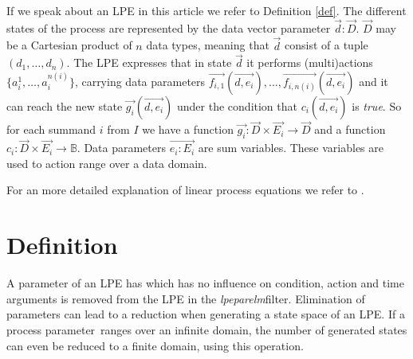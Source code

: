 \documentclass[a4paper,10pt]{article}
\theoremstyle{plain}
\theoremstyle{definition}
\newcommand{\lpe}{linear process equation}
\newcommand{\tool}{\textit{lpeparelm}}
\newcommand{\ti}{\textit}
\newcommand{\ovr}{\overrightarrow}
\newcommand{\pp}{process parameter}
\begin{document}
If we speak about an LPE in this article we refer to Definition \ref{def}.  The different states 
of the process are represented by the data vector parameter $\ovr{d}:\ovr{D}$. $\ovr{D}$ may be a Cartesian product of $n$ data types, meaning that $\ovr{d}$ consist of a tuple $(d_1, \ldots, d_n)$. The LPE expresses that in state $\ovr{d}$ it performs (multi)actions $\lbrace a_i^1, \ldots , a_i^{n(i)} \rbrace$, carrying data parameters $\ovr{f_{i,1}}(\ovr{d,e_i}), \ldots , \ovr{f_{i,n(i)}}(\ovr{d, e_i})$ and 
it can reach the new state $\ovr{g_i}(\ovr{d ,e_i})$ under the condition that $c_i(\ovr{d , e_i})$ is \ti{true}. So for each summand $i$ from $I$ we have a function $\ovr{g_i}: \ovr{D} \times \ovr{E_i} \rightarrow \ovr{D}$ and a function $c_i: \ovr{D} \times \ovr{E_i} \rightarrow \mathbb{B}$.
Data parameters $\ovr{e_i : E_i}$ are sum variables. These variables are used to action range over a data domain. 

For an more detailed explanation of \lpe s  we refer to \cite{LPE_info}.

\section{Definition}
A parameter of an LPE has which has no influence on condition, action and time arguments is removed from the LPE in the \tool filter. Elimination of parameters can lead to a reduction when generating a state space of an LPE. If a \pp\ ranges over an infinite domain, the number of generated states can even be reduced to a finite domain, using this operation. %


\end{document}
